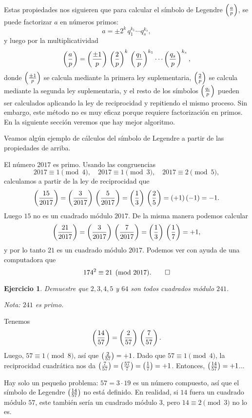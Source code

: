 \documentclass{article}
\theoremstyle{plain}
\newtheorem{ejerc}{Ejercicio}
\begin{document}
Estas propiedades nos siguieren que para calcular el símbolo de Legendre
$\left(\frac{a}{p}\right)$, se puede factorizar $a$ en números primos:
$$a = \pm 2^k\,q_1^{k_1}\cdots q_s^{k_s},$$
y luego por la multiplicatividad
$$\left(\frac{a}{p}\right) = \left(\frac{\pm 1}{p}\right)\,\left(\frac{2}{p}\right)^k\,\left(\frac{q_1}{p}\right)^{k_1}\cdots \left(\frac{q_s}{p}\right)^{k_s},$$
donde $\left(\frac{\pm 1}{p}\right)$ se calcula mediante la primera ley suplementaria,
$\left(\frac{2}{p}\right)$ se calcula mediante la segunda ley suplementaria, y el resto
de los símbolos $\left(\frac{q_i}{p}\right)$ pueden ser calculados aplicando la ley de
reciprocidad y repitiendo el mismo proceso. Sin embargo, este método no es muy
eficaz porque requiere factorización en primos. En la siguiente sección veremos
que hay mejor algoritmo.

Veamos algún ejemplo de cálculos del símbolo de Legendre a partir de las
propiedades de arriba.

\begin{ejemplo}
  El número $2017$ es primo. Usando las congruencias
  $$2017 \equiv 1 \pmod{4}, \quad 2017 \equiv 1 \pmod{3}, \quad 2017 \equiv 2 \pmod{5},$$
  calculamos a partir de la ley de reciprocidad que
  $$\left(\frac{15}{2017}\right) = \left(\frac{3}{2017}\right)\,\left(\frac{5}{2017}\right) = \left(\frac{1}{3}\right)\,\left(\frac{2}{5}\right) = (+1)\,(-1) = -1.$$
  Luego $15$ no es un cuadrado módulo $2017$.  De la misma manera podemos
  calcular
  $$\left(\frac{21}{2017}\right) = \left(\frac{3}{2017}\right)\,\left(\frac{7}{2017}\right) = \left(\frac{1}{3}\right)\,\left(\frac{1}{7}\right) = +1,$$
  y por lo tanto $21$ es un cuadrado módulo $2017$. Podemos ver con ayuda de una
  computadora que
  \[ 174^2 \equiv 21 \pmod{2017}. \qedhere \]
\end{ejemplo}

\begin{ejerc}
  Demuestre que $2, 3, 4, 5$ y $64$ son todos cuadrados módulo $241$.

  \noindent Nota: $241$ es primo.
\end{ejerc}

\begin{ejemplo}
  \label{ejemplo:primo-de-Grothendieck}
  Tenemos
  $$\left(\frac{14}{57}\right) = \left(\frac{2}{57}\right)\,\left(\frac{7}{57}\right).$$
  Luego, $57 \equiv 1 \pmod{8}$, así que $\left(\frac{2}{57}\right) = +1$. Dado que
  $57 \equiv 1 \pmod{4}$, la reciprocidad cuadrática nos da
  $\left(\frac{7}{57}\right) = \left(\frac{57}{7}\right) = \left(\frac{1}{7}\right) = +1$. Entonces,
  $\left(\frac{14}{57}\right) = +1$...

  \vspace{1em}

  Hay solo un pequeño problema: $57 = 3\cdot 19$ es un número compuesto, así que
  el símbolo de Legendre $\left(\frac{14}{57}\right)$ no está definido. En realidad, si
  $14$ fuera un cuadrado módulo $57$, este también sería un cuadrado módulo $3$,
  pero $14 \equiv 2 \pmod{3}$ no lo es.
\end{ejemplo}
\end{document}
